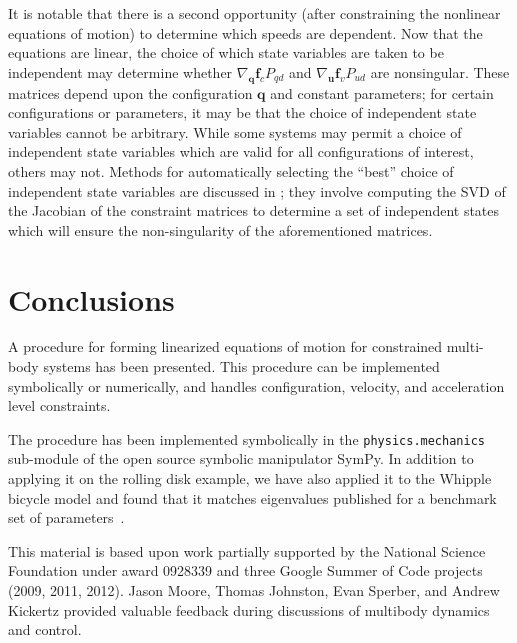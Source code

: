 \documentclass[smallcondensed,final]{svjour3}                     %
\begin{document}
It is notable that there is a second opportunity (after constraining the
nonlinear equations of motion) to determine which speeds are dependent.
Now that the equations are linear, the choice of which state variables are
taken to be independent may determine whether $\nabla_{\bm{q}}\bm{f}_{c}
P_{qd}$ and $\nabla_{\bm{u}} \bm{f}_{v} P_{ud}$ are nonsingular.
These matrices depend upon the configuration $\bm{q}$ and constant parameters;
for certain configurations or parameters, it may be that the choice of
independent state variables cannot be arbitrary.
While some systems may permit a choice of independent state variables which are
valid for all configurations of interest, others may not.
Methods for automatically selecting the ``best'' choice of independent state
variables are discussed in \cite{Reckdahl1996}; they involve computing the SVD
of the Jacobian of the constraint matrices to determine a set of independent
states which will ensure the non-singularity of the aforementioned matrices.

\section{Conclusions}
A procedure for forming linearized equations of motion for constrained
multi-body systems has been presented.  This procedure can be implemented
symbolically or numerically, and handles configuration, velocity, and
acceleration level constraints.


The procedure has been implemented symbolically in the
\texttt{physics.mechanics} sub-module of the open source symbolic
manipulator SymPy\cite{SymPy2012}. In addition to applying it on the rolling
disk example, we have also applied it to the Whipple bicycle model and found
that it matches eigenvalues published for a benchmark set of
parameters~\cite{Meijaard2007}.

\begin{acknowledgements}
 This material is based upon work partially supported by the National Science
 Foundation under award 0928339 and three Google Summer of Code projects (2009,
 2011, 2012).  Jason Moore, Thomas Johnston, Evan Sperber, and Andrew Kickertz
 provided valuable feedback during discussions of multibody dynamics and
 control.
\end{acknowledgements}

\appendix
\end{document}
